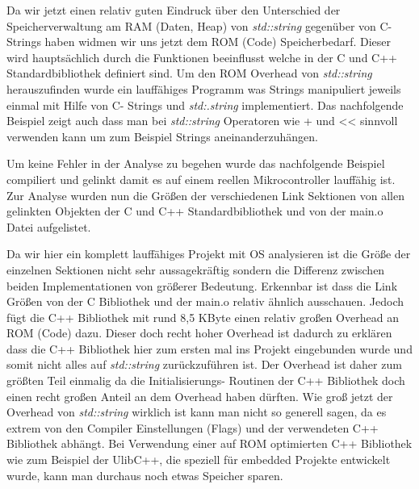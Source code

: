 \documentclass[MES,Master,ngerman]{twbook}%
\begin{document}
\newpage
Da wir jetzt einen relativ guten Eindruck über den Unterschied der Speicherverwaltung am RAM (Daten, Heap) von \textit{std::string} gegenüber von C-Strings haben widmen wir uns jetzt dem ROM (Code) Speicherbedarf. Dieser wird hauptsächlich durch die Funktionen beeinflusst welche in der C und C++ Standardbibliothek definiert sind. Um den ROM Overhead von \textit{std::string} herauszufinden wurde ein lauffähiges Programm was Strings manipuliert jeweils einmal mit Hilfe von C- Strings und \textit{std:.string} implementiert. Das nachfolgende Beispiel zeigt auch dass man bei \textit{std::string} Operatoren wie + und << sinnvoll verwenden kann um zum Beispiel Strings aneinanderzuhängen.
\newpage

 Um keine Fehler in der Analyse zu begehen wurde das nachfolgende Beispiel compiliert und gelinkt damit es auf einem reellen Mikrocontroller lauffähig ist. Zur Analyse wurden nun die Größen der verschiedenen Link Sektionen von allen gelinkten Objekten der C und C++ Standardbibliothek und von der main.o Datei aufgelistet.

\begin{figure}[!htb]
	\begin{subfigure}[b]{0.5\textwidth}
		
		\label{fig:11}
	\end{subfigure}
	\begin{subfigure}[b]{0.5\textwidth}
		
		\label{fig:12}
	\end{subfigure}
\end{figure}

Da wir hier ein komplett lauffähiges Projekt mit OS analysieren ist die Größe der einzelnen Sektionen nicht sehr aussagekräftig sondern die Differenz zwischen beiden Implementationen von größerer Bedeutung. Erkennbar ist dass die Link Größen von der C Bibliothek und der main.o relativ ähnlich ausschauen. Jedoch fügt die C++ Bibliothek mit rund 8,5 KByte einen relativ großen Overhead an ROM (Code) dazu. Dieser doch recht hoher Overhead ist dadurch zu erklären dass die C++ Bibliothek hier zum ersten mal ins Projekt eingebunden wurde und somit nicht alles auf \textit{std::string} zurückzuführen ist. Der Overhead ist daher zum größten Teil einmalig da die Initialisierungs- Routinen der C++ Bibliothek doch einen recht großen Anteil an dem Overhead haben dürften. Wie groß jetzt der Overhead von \textit{std::string} wirklich ist kann man nicht so generell sagen, da es extrem von den Compiler Einstellungen (Flags) und der verwendeten C++ Bibliothek abhängt. Bei Verwendung einer auf ROM optimierten C++ Bibliothek wie zum Beispiel der UlibC++, die speziell für embedded Projekte entwickelt wurde, kann man durchaus noch etwas Speicher sparen.
\end{document}
